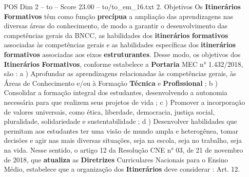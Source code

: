 \begin{textsample}{POS Dim 2 – to – Score 23.00 – to/to\_em\_16.txt}  \label{ex:f2_pos_136}
2.
Objetivos Os \textbf{Itinerários} \textbf{Formativos} têm como função \textbf{precípua} a ampliação das aprendizagens nas diversas áreas do conhecimento, de modo a garantir o desenvolvimento das competências gerais da BNCC, as habilidades dos \textbf{itinerários} \textbf{formativos} associadas às competências gerais e as habilidades específicas dos \textbf{itinerários} \textbf{formativos} associadas aos eixos \textbf{estruturantes}.
Desse modo, os objetivos dos \textbf{Itinerários} \textbf{Formativos}, conforme estabelece a \textbf{Portaria} MEC n{\EmojiFont °} 1.432/2018, são : a ) Aprofundar as aprendizagens relacionadas às competências gerais, às Áreas de Conhecimento e/ou à Formação \textbf{Técnica} e \textbf{Profissional} ; b ) Consolidar a formação integral dos estudantes, desenvolvendo a autonomia necessária para que realizem seus projetos de vida ; c ) Promover a incorporação de valores universais, como ética, liberdade, democracia, justiça social, pluralidade, solidariedade e sustentabilidade ; d ) Desenvolver habilidades que permitam aos estudantes ter uma visão de mundo ampla e heterogênea, tomar decisões e agir nas mais diversas situações, seja na escola, seja no trabalho, seja na vida.
Nesse sentido, o artigo 12 da Resolução CNE n{\EmojiFont °} 03, de 21 de novembro de 2018, que \textbf{atualiza} as \textbf{Diretrizes} Curriculares Nacionais para o Ensino Médio, estabelece que a organização dos \textbf{Itinerários} deve considerar : Art. 12.

\end{textsample}
